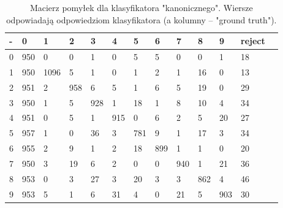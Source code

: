 \documentclass[a4paper]{article}
\begin{document}
\begin{table}[H]
    \caption{Macierz pomyłek dla klasyfikatora "kanonicznego".
    Wiersze odpowiadają odpowiedziom klasyfikatora (a kolumny -- "ground truth").
    \label{table:confusion}
    }
\begin{center}
    \begin{tabular}{| l | l | l | l | l | l | l | l | l | l | l | l | l |}
    \hline
        - & 0 & 1 & 2 & 3 & 4 & 5 & 6 & 7 & 8 & 9 & reject\\
    \hline
        0 &  950  &   0   &  0  &   1  &   0  &   5  &   5 &    0  &   0 &    1   & 18 \\
        1 &  950  &1096   &  5  &   1  &   0  &   1  &   2 &    1  &  16 &    0   & 13 \\
        2 &  951  &   2   &958  &   6  &   5  &   1  &   6 &    5  &  19 &    0   & 29 \\
        3 &  950  &   1   &  5  & 928  &   1  &  18  &   1 &    8  &  10 &    4   & 34 \\
        4 &  951  &   0   &  5  &   1  & 915  &   0  &   6 &    2  &   5 &   20   & 27 \\
        5 &  957  &   1   &  0  &  36  &   3  & 781  &   9 &    1  &  17 &    3   & 34 \\
        6 &  955  &   2   &  9  &   1  &   2  &  18  & 899 &    1  &   1 &    0   & 20 \\
        7 &  950  &   3   & 19  &   6  &   2  &   0  &   0 &  940  &   1 &   21   & 36 \\
        8 &  953  &   0   &  3  &  27  &   3  &  20  &   3 &    3  & 862 &    4   & 46 \\
        9 &  953  &   5   &  1  &   6  &  31  &   4  &   0 &   21  &   5 &  903   & 30 \\
    \hline
    \end{tabular}
\end{center}
\end{table}
\end{document}
